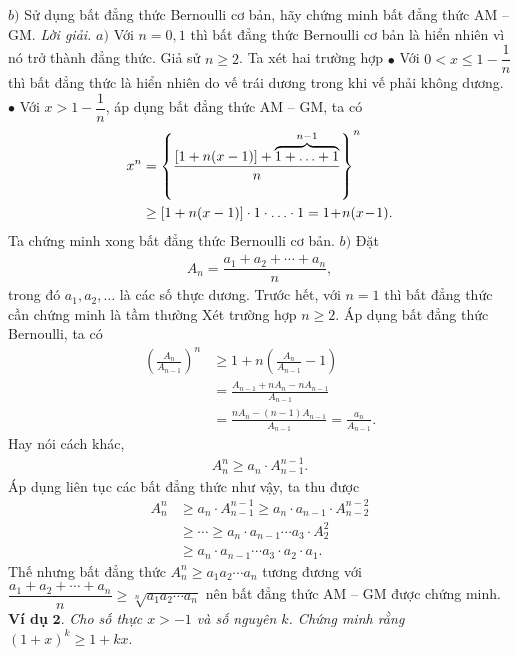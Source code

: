\begin{multicols}{2}
{		\vskip 0.1cm
		$b)$ Sử dụng bất đẳng thức Bernoulli cơ bản, hãy chứng minh bất đẳng thức AM -- GM.}
		\vskip 0.1cm
		\textit{Lời giải.}
		$a)$ Với $n=0,1$ thì bất đẳng thức Bernoulli cơ bản là hiển nhiên vì nó trở thành đẳng thức. Giả sử $n \geq 2$. Ta xét hai trường hợp 
		\vskip 0.1cm
		$\bullet$ Với $0<x \le 1-\dfrac{1}{n}$ thì bất đẳng thức là hiển nhiên do vế trái dương trong khi vế phải không dương.
		\vskip 0.1cm
		$\bullet$ Với $x>1-\dfrac{1}{n}$, áp dụng bất đẳng thức AM -- GM, ta có
		\begin{align*}
			{x^n}{\rm{ }} &= {\left\{ {\frac{{[1 + n(x - 1)] + \overbrace {1 +  \ldots  + 1}^{n - 1}}}{n}} \right\}^n} \\
			&\ge [1 + n(x - 1)] \cdot 1 \cdot  \ldots  \cdot 1 = 1 \!+\! n(x \!-\! 1).
		\end{align*}
		Ta chứng minh xong bất đẳng thức Bernoulli cơ bản.
		\vskip 0.1cm	
		$b)$ Đặt
		\begin{align*}
			A_n=\dfrac{a_1+a_2+\cdots+a_n}{n},
		\end{align*}
		trong đó $a_1, a_2, \ldots$ là các số thực dương. 
		Trước hết, với $n=1$ thì bất đẳng thức cần chứng minh là tầm thường 
		Xét trường hợp $n \geq 2$. Áp dụng bất đẳng thức Bernoulli, ta có
		\begin{align*}
			\left(\frac{A_{n}}{A_{n-1}}\right)^{n} & \geq 1+n\left(\frac{A_{n}}{A_{n-1}}-1\right) \\
			&=\frac{A_{n-1}+n A_{n}-n A_{n-1}}{A_{n-1}} \\
			&=\frac{n A_{n}-(n-1) A_{n-1}}{A_{n-1}}=\frac{a_{n}}{A_{n-1}}.
		\end{align*}
		Hay nói cách khác,
		\begin{align*}
			A_{n}^{n} \geq a_{n} \cdot A_{n-1}^{n-1}.
		\end{align*}		
		Áp dụng liên tục các bất đẳng thức như vậy, ta thu được
		\begin{align*}
			A_{n}^{n}  &\geq a_{n} \cdot A_{n-1}^{n-1} \geq a_{n} \cdot a_{n-1} \cdot A_{n-2}^{n-2}  \\
			&\geq \cdots \geq a_{n} \cdot a_{n-1} \cdots a_{3} \cdot A_{2}^{2} \\
			&\geq a_{n} \cdot a_{n-1} \cdots a_{3} \cdot a_2 \cdot a_1.
		\end{align*}
		Thế nhưng bất đẳng thức $A_n^n \geq a_1a_2 \cdots a_n$ tương đương với $\dfrac{a_1+a_2+\cdots+a_n}{n} \geq \sqrt[n]{a_1a_2\cdots a_n}$ nên bất đẳng thức AM -- GM được chứng minh.
		\vskip 0.1cm
		\textbf{\color{hoccungpi}Ví dụ} $\pmb{2.}$ \textit{Cho số thực $x>-1$ và số nguyên $k$. Chứng minh rằng $(1+x)^{k} \geq 1+ k x.$}

\end{multicols}
